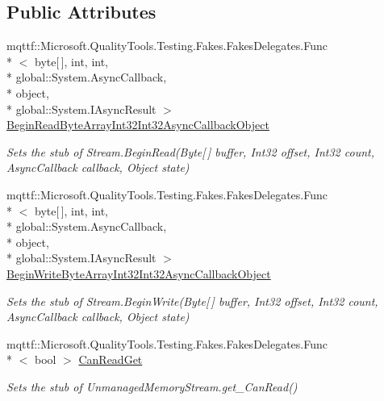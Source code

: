 \subsection*{Public Attributes}
\begin{DoxyCompactItemize}
\item 
mqttf\-::\-Microsoft.\-Quality\-Tools.\-Testing.\-Fakes.\-Fakes\-Delegates.\-Func\\*
$<$ byte\mbox{[}$\,$\mbox{]}, int, int, \\*
global\-::\-System.\-Async\-Callback, \\*
object, \\*
global\-::\-System.\-I\-Async\-Result $>$ \hyperlink{class_system_1_1_i_o_1_1_fakes_1_1_stub_unmanaged_memory_stream_adc817086cd12e4025b75f927d7b7db82}{Begin\-Read\-Byte\-Array\-Int32\-Int32\-Async\-Callback\-Object}
\begin{DoxyCompactList}\small\item\em Sets the stub of Stream.\-Begin\-Read(\-Byte\mbox{[}$\,$\mbox{]} buffer, Int32 offset, Int32 count, Async\-Callback callback, Object state)\end{DoxyCompactList}\item 
mqttf\-::\-Microsoft.\-Quality\-Tools.\-Testing.\-Fakes.\-Fakes\-Delegates.\-Func\\*
$<$ byte\mbox{[}$\,$\mbox{]}, int, int, \\*
global\-::\-System.\-Async\-Callback, \\*
object, \\*
global\-::\-System.\-I\-Async\-Result $>$ \hyperlink{class_system_1_1_i_o_1_1_fakes_1_1_stub_unmanaged_memory_stream_a290c4539fed1022f8c86270e72996091}{Begin\-Write\-Byte\-Array\-Int32\-Int32\-Async\-Callback\-Object}
\begin{DoxyCompactList}\small\item\em Sets the stub of Stream.\-Begin\-Write(\-Byte\mbox{[}$\,$\mbox{]} buffer, Int32 offset, Int32 count, Async\-Callback callback, Object state)\end{DoxyCompactList}\item 
mqttf\-::\-Microsoft.\-Quality\-Tools.\-Testing.\-Fakes.\-Fakes\-Delegates.\-Func\\*
$<$ bool $>$ \hyperlink{class_system_1_1_i_o_1_1_fakes_1_1_stub_unmanaged_memory_stream_ad161499583178078d28d036b4da8215b}{Can\-Read\-Get}
\begin{DoxyCompactList}\small\item\em Sets the stub of Unmanaged\-Memory\-Stream.\-get\-\_\-\-Can\-Read()\end{DoxyCompactList}\item 

\end{DoxyCompactItemize}
